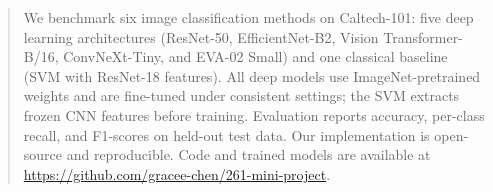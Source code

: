 \begin{abstract}
We benchmark six image classification methods on Caltech-101: five deep learning architectures (ResNet-50, EfficientNet-B2, Vision Transformer-B/16, ConvNeXt-Tiny, and EVA-02 Small) and one classical baseline (SVM with ResNet-18 features). All deep models use ImageNet-pretrained weights and are fine-tuned under consistent settings; the SVM extracts frozen CNN features before training. Evaluation reports accuracy, per-class recall, and F1-scores on held-out test data. Our implementation is open-source and reproducible. Code and trained models are available at \url{https://github.com/gracee-chen/261-mini-project}.
\end{abstract}
